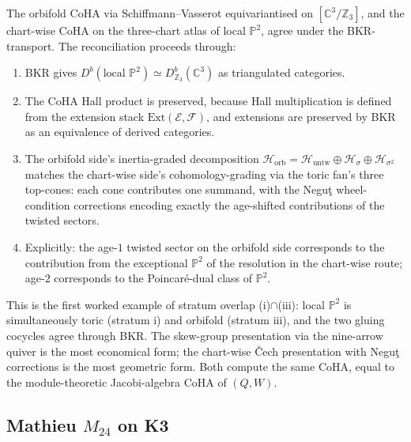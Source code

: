 The orbifold CoHA via Schiffmann--Vasserot equivariantised on $[\mathbb{C}^3/\mathbb{Z}_3]$, and the chart-wise CoHA on the three-chart atlas of local $\mathbb{P}^2$, agree under the BKR-transport. The reconciliation proceeds through:
\begin{enumerate}
 \item BKR gives $D^b(\text{local } \mathbb{P}^2) \simeq D^b_{\mathbb{Z}_3}(\mathbb{C}^3)$ as triangulated categories.
 \item The CoHA Hall product is preserved, because Hall multiplication is defined from the extension stack $\mathrm{Ext}(\mathcal{E}, \mathcal{F})$, and extensions are preserved by BKR as an equivalence of derived categories.
 \item The orbifold side's inertia-graded decomposition $\mathcal{H}_{\mathrm{orb}} = \mathcal{H}_{\mathrm{untw}} \oplus \mathcal{H}_{\sigma} \oplus \mathcal{H}_{\sigma^2}$ matches the chart-wise side's cohomology-grading via the toric fan's three top-cones: each cone contributes one summand, with the Negu\c{t} wheel-condition corrections encoding exactly the age-shifted contributions of the twisted sectors.
 \item Explicitly: the age-$1$ twisted sector on the orbifold side corresponds to the contribution from the exceptional $\mathbb{P}^2$ of the resolution in the chart-wise route; age-$2$ corresponds to the Poincar\'e-dual class of $\mathbb{P}^2$.
\end{enumerate}

This is the first worked example of stratum overlap (i)$\cap$(iii): local $\mathbb{P}^2$ is simultaneously toric (stratum i) and orbifold (stratum iii), and the two gluing cocycles agree through BKR. The skew-group presentation via the nine-arrow quiver is the most economical form; the chart-wise \v{C}ech presentation with Negu\c{t} corrections is the most geometric form. Both compute the same CoHA, equal to the module-theoretic Jacobi-algebra CoHA of $(Q, W)$.

\subsection{Mathieu \texorpdfstring{$M_{24}$}{M24} on K3}
\label{sec:mathieu-m24}

